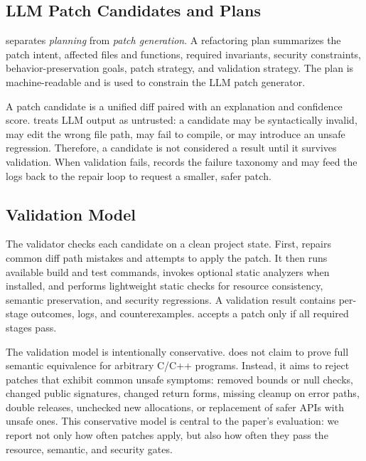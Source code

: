 \subsection{LLM Patch Candidates and Plans}
\label{sec:prelim-patches}

\SysName{} separates \emph{planning} from \emph{patch generation}. A refactoring plan
summarizes the patch intent, affected files and functions, required invariants,
security constraints, behavior-preservation goals, patch strategy, and validation
strategy. The plan is machine-readable and is used to constrain the LLM patch
generator.

A patch candidate is a unified diff paired with an explanation and confidence
score. \SysName{} treats LLM output as untrusted: a candidate may be syntactically
invalid, may edit the wrong file path, may fail to compile, or may introduce an
unsafe regression. Therefore, a candidate is not considered a \SysName{} result until
it survives validation. When validation fails, \SysName{} records the failure taxonomy
and may feed the logs back to the repair loop to request a smaller, safer patch.

\subsection{Validation Model}
\label{sec:prelim-validation}

The validator checks each candidate on a clean project state. First, \SysName{} repairs
common diff path mistakes and attempts to apply the patch. It then runs available
build and test commands, invokes optional static analyzers when installed, and
performs lightweight static checks for resource consistency, semantic
preservation, and security regressions. A validation result contains per-stage
outcomes, logs, and counterexamples. \SysName{} accepts a patch only if all required
stages pass.

The validation model is intentionally conservative. \SysName{} does not claim to prove
full semantic equivalence for arbitrary C/C++ programs. Instead, it aims to
reject patches that exhibit common unsafe symptoms: removed bounds or null
checks, changed public signatures, changed return forms, missing cleanup on error
paths, double releases, unchecked new allocations, or replacement of safer APIs
with unsafe ones. This conservative model is central to the paper's evaluation:
we report not only how often patches apply, but also how often they pass the
resource, semantic, and security gates.

